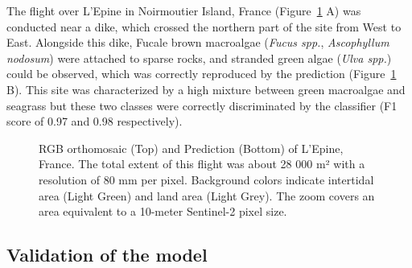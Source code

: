 \documentclass[
  number]{elsarticle}
\begin{document}
The flight over L'Epine in Noirmoutier Island, France
(Figure~\ref{fig-Dike} A) was conducted near a dike, which crossed the
northern part of the site from West to East. Alongside this dike, Fucale
brown macroalgae (\emph{Fucus spp.}, \emph{Ascophyllum nodosum}) were
attached to sparse rocks, and stranded green algae (\emph{Ulva spp.})
could be observed, which was correctly reproduced by the prediction
(Figure~\ref{fig-Dike} B). This site was characterized by a high mixture
between green macroalgae and seagrass but these two classes were
correctly discriminated by the classifier (F1 score of 0.97 and 0.98
respectively).

\label{cell-fig-Dike}
\begin{figure}[H]


\caption{\label{fig-Dike}RGB orthomosaic (Top) and Prediction (Bottom)
of L'Epine, France. The total extent of this flight was about 28 000 m²
with a resolution of 80 mm per pixel. Background colors indicate
intertidal area (Light Green) and land area (Light Grey). The zoom
covers an area equivalent to a 10-meter Sentinel-2 pixel size.}

\end{figure}%

\subsection{Validation of the model}\label{validation-of-the-model}
\end{document}
